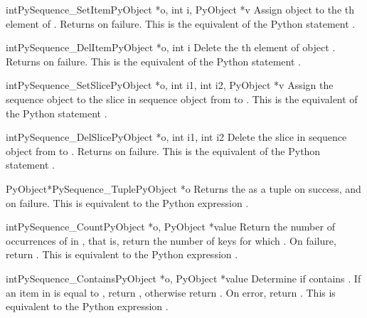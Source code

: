 \documentclass{manual}
\begin{document}
\begin{cfuncdesc}{int}{PySequence_SetItem}{PyObject *o, int i, PyObject *v}
Assign object  to the th element of .
Returns  on failure.  This is the equivalent of the Python
statement .
\end{cfuncdesc}

\begin{cfuncdesc}{int}{PySequence_DelItem}{PyObject *o, int i}
Delete the th element of object .  Returns
 on failure.  This is the equivalent of the Python
statement .
\end{cfuncdesc}

\begin{cfuncdesc}{int}{PySequence_SetSlice}{PyObject *o, int i1,
                                            int i2, PyObject *v}
Assign the sequence object  to the slice in sequence
object  from  to .  This is the equivalent of
the Python statement .
\end{cfuncdesc}

\begin{cfuncdesc}{int}{PySequence_DelSlice}{PyObject *o, int i1, int i2}
Delete the slice in sequence object  from  to .
Returns  on failure. This is the equivalent of the Python
statement .
\end{cfuncdesc}

\begin{cfuncdesc}{PyObject*}{PySequence_Tuple}{PyObject *o}
Returns the  as a tuple on success, and \NULL{} on failure.
This is equivalent to the Python expression .
\end{cfuncdesc}

\begin{cfuncdesc}{int}{PySequence_Count}{PyObject *o, PyObject *value}
Return the number of occurrences of  in , that is,
return the number of keys for which .  On failure, return .  This is equivalent to
the Python expression .
\end{cfuncdesc}

\begin{cfuncdesc}{int}{PySequence_Contains}{PyObject *o, PyObject *value}
Determine if  contains .  If an item in  is
equal to , return , otherwise return .  On
error, return .  This is equivalent to the Python expression
.
\end{cfuncdesc}
\end{document}

